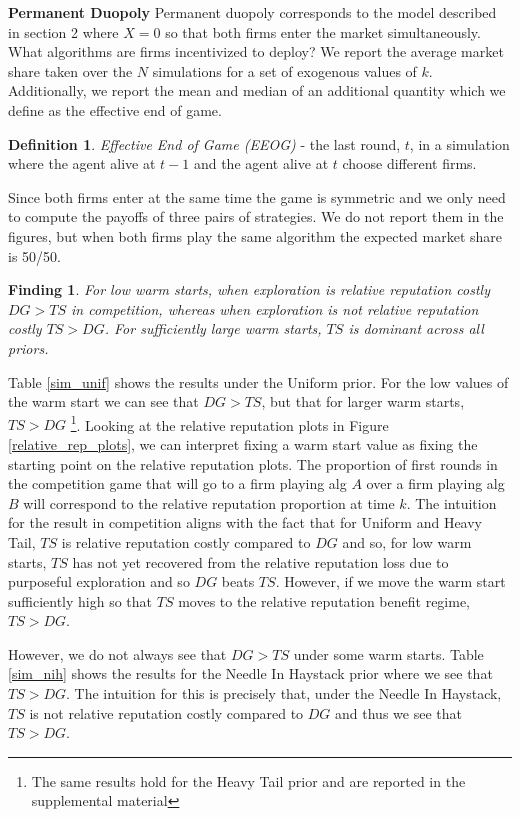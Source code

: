 \documentclass{article}
\theoremstyle{definition}
\newtheorem{definition}{Definition}
\newtheorem{finding}{Finding}
\begin{document}
\textbf{Permanent Duopoly} Permanent duopoly corresponds to the model described in section 2 where $X = 0$ so that both firms enter the market simultaneously. What algorithms are firms incentivized to deploy? We report the average market share taken over the $N$ simulations for a set of exogenous values of $k$. Additionally, we report the mean and median of an additional quantity which we define as the effective end of game.

\begin{definition}
\textit{Effective End of Game (EEOG)} - the last round, $t$, in a simulation where the agent alive at $t-1$ and the agent alive at $t$ choose different firms.
\end{definition}

Since both firms enter at the same time the game is symmetric and we only need to compute the payoffs of three pairs of strategies. We do not report them in the figures, but when both firms play the same algorithm the expected market share is 50/50.

\begin{finding}
\textit{For low warm starts, when exploration is relative reputation costly $DG >TS$ in competition, whereas when exploration is not relative reputation costly $TS > DG$. For sufficiently large warm starts, $TS$ is dominant across all priors.}
\end{finding}

Table \ref{sim_unif} shows the results under the Uniform prior. For the low values of the warm start we can see that $DG > TS$, but that for larger warm starts, $TS > DG$ \footnote{The same results hold for the Heavy Tail prior and are reported in the supplemental material}. Looking at the relative reputation plots in Figure \ref{relative_rep_plots}, we can interpret fixing a warm start value as fixing the starting point on the relative reputation plots. The proportion of first rounds in the competition game that will go to a firm playing alg $A$ over a firm playing alg $B$ will correspond to the relative reputation proportion at time $k$. The intuition for the result in competition aligns with the fact that for Uniform and Heavy Tail, $TS$ is relative reputation costly compared to $DG$ and so, for low warm starts, $TS$ has not yet recovered from the relative reputation loss due to purposeful exploration and so $DG$ beats $TS$. However, if we move the warm start sufficiently high so that $TS$ moves to the relative reputation benefit regime, $TS > DG$.

However, we do not always see that $DG > TS$ under some warm starts. Table \ref{sim_nih} shows the results for the Needle In Haystack prior where we see that $TS > DG$. The intuition for this is precisely that, under the Needle In Haystack, $TS$ is not relative reputation costly compared to $DG$ and thus we see that $TS > DG$.
\end{document}
